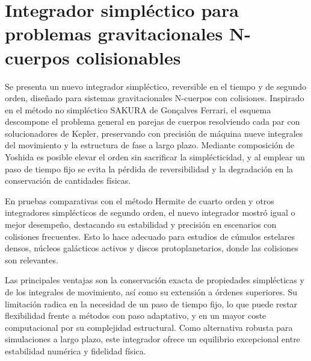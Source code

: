 \section[Integrador simpléctico para problemas gravitacionales]{Integrador simpléctico para problemas gravitacionales N-cuerpos colisionables}%
\label{sec:state_of_the_art_06}
Se presenta un nuevo integrador simpléctico, reversible en el tiempo y de segundo orden, diseñado para sistemas gravitacionales N-cuerpos con colisiones. Inspirado en el método no simpléctico SAKURA de Gonçalves Ferrari, el esquema descompone el problema general en parejas de cuerpos resolviendo cada par con solucionadores de Kepler, preservando con precisión de máquina nueve integrales del movimiento y la estructura de fase a largo plazo. Mediante composición de Yoshida es posible elevar el orden sin sacrificar la simplécticidad, y al emplear un paso de tiempo fijo se evita la pérdida de reversibilidad y la degradación en la conservación de cantidades físicas.

En pruebas comparativas con el método Hermite de cuarto orden y otros integradores simplécticos de segundo orden, el nuevo integrador mostró igual o mejor desempeño, destacando su estabilidad y precisión en escenarios con colisiones frecuentes. Esto lo hace adecuado para estudios de cúmulos estelares densos, núcleos galácticos activos y discos protoplanetarios, donde las colisiones son relevantes.

Las principales ventajas son la conservación exacta de propiedades simplécticas y de los integrales de movimiento, así como su extensión a órdenes superiores. Su limitación radica en la necesidad de un paso de tiempo fijo, lo que puede restar flexibilidad frente a métodos con paso adaptativo, y en un mayor coste computacional por su complejidad estructural. Como alternativa robusta para simulaciones a largo plazo, este integrador ofrece un equilibrio excepcional entre estabilidad numérica y fidelidad física.

